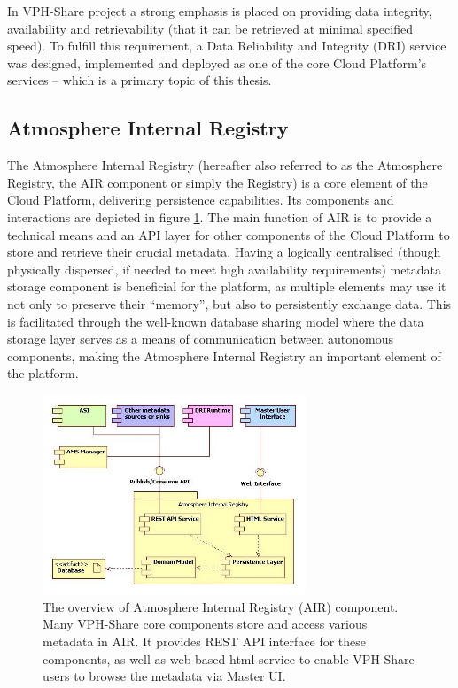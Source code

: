 In VPH-Share project a strong emphasis is placed on providing data integrity,
availability and retrievability (that it can be retrieved at minimal specified
speed). To fulfill this requirement, a Data Reliability and Integrity (DRI)
service was designed, implemented and deployed as one of the core Cloud
Platform's services -- which is a primary topic of this thesis.\\

\subsection{Atmosphere Internal Registry}
\label{air}
The Atmosphere Internal Registry (hereafter also referred to as the Atmosphere
Registry, the AIR component or simply the Registry) is a core element of the 
Cloud Platform, delivering persistence capabilities. Its components and
interactions are depicted in figure \ref{fig:air-architecture}. The main 
function of AIR is to provide a technical means and an API layer for other 
components of the Cloud Platform to store and retrieve their crucial metadata. Having 
a logically centralised (though physically dispersed, if needed to meet high
availability requirements) metadata storage component is beneficial for the 
platform, as multiple elements may use it not only to preserve their “memory”,
but also to persistently exchange data. 
This is facilitated through the well-known database sharing 
model where the data storage layer serves as a means of communication between
autonomous components, making the Atmosphere Internal Registry an important 
element of the platform.

\begin{figure}[h!]
	\centering
	\includegraphics[width=0.7\textwidth]{images/air-architecture.png}
	\caption{The overview of Atmosphere Internal Registry (AIR) component.
	Many VPH-Share core components store and access various metadata in AIR.
	It provides REST API interface for these components, as well as web-based
	html service to enable VPH-Share users to browse the metadata via Master UI.}
	\label{fig:air-architecture}
\end{figure}

